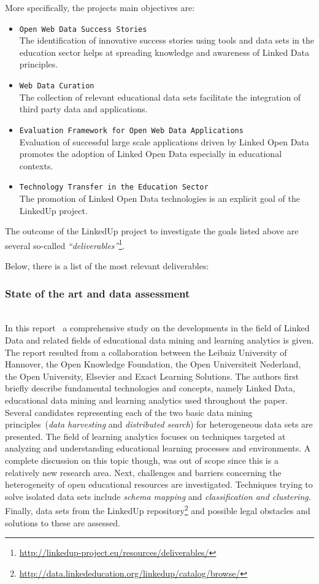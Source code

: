 More specifically, the projects main objectives are:
\begin{itemize}
	\item \texttt{Open Web Data Success Stories}~\\
	The identification of innovative success stories using tools and data sets in the education sector helps at spreading knowledge and awareness of Linked Data 
	principles. 
	\item \texttt{Web Data Curation}~\\
	The collection of relevant educational data sets facilitate the integration of third party data and applications. 
	\item \texttt{Evaluation Framework for Open Web Data Applications}~\\
	Evaluation of successful large scale applications driven by Linked Open Data promotes the adoption of Linked Open Data especially in educational contexts. 
	\item \texttt{Technology Transfer in the Education Sector}~\\
	The promotion of Linked Open Data technologies is an explicit goal of the LinkedUp project. 
\end{itemize}

The outcome of the LinkedUp project to investigate the goals listed above are several so-called \textit{``deliverables''}\footnote{\url{http://linkedup-project.eu/resources/deliverables/}}. 

Below, there is a list of the most relevant deliverables:

\subsubsection{State of the art and data assessment}~\\
In this report~\cite{url:linkedup_state_of_the_art_and_data_assessment} a comprehensive study on the developments in the field of Linked Data and related fields of educational data mining and learning analytics is given. The report resulted from a collaboration between the Leibniz University of Hannover, the Open Knowledge Foundation, the Open Universiteit Nederland, the Open University, Elsevier and Exact Learning Solutions. The authors first briefly describe fundamental technologies and concepts, namely Linked Data, educational data mining and learning analytics used throughout the paper. Several candidates representing each of the two basic data mining principles~(\textit{data harvesting} and \textit{distributed search}) for heterogeneous data sets are presented. The field of learning analytics focuses on techniques targeted at analyzing and understanding educational learning processes and environments. A complete discussion on this topic though, was out of scope since this is a relatively new research area. Next, challenges and barriers concerning the heterogeneity of open educational resources are investigated. Techniques trying to solve isolated data sets include \textit{schema mapping} and \textit{classification and clustering}. Finally, data sets from the LinkedUp repository\footnote{\url{http://data.linkededucation.org/linkedup/catalog/browse/}} and possible legal obstacles and solutions to these are assessed. 

